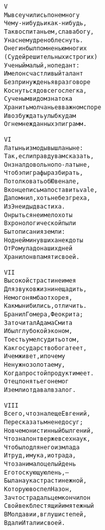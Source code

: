\begin{minipage}[t]{\dimexpr 0.5\textwidth -\tabcolsep-.5pt}
\begin{alltt}\normalfont\centering
V
Мы все учились понемногу
Чему-нибудь и как-нибудь,
Так воспитаньем, слава богу,
У нас немудрено блеснуть.
Онегин был по мненью многих
(Судей решительных и строгих)
Ученый малый, но педант:
Имел он счастливый талант
Без принужденья в разговоре
Коснуться до всего слегка,
С ученым видом знатока
Хранить молчанье в важном споре
И возбуждать улыбку дам
Огнем нежданных эпиграмм.
\end{alltt}
\end{minipage}

\begin{minipage}[t]{\dimexpr 0.5\textwidth -\tabcolsep-.5pt}
\begin{alltt}\normalfont\centering
VI
Латынь из моды вышла ныне:
Так, если правду вам сказать,
Он знал довольно по-латыне,
Чтоб эпиграфы разбирать,
Потолковать об Ювенале,
В конце письма поставить vale,
Да помнил, хоть не без греха,
Из Энеиды два стиха.
Он рыться не имел охоты
В хронологической пыли
Бытописания земли:
Но дней минувших анекдоты
От Ромула до наших дней
Хранил он в памяти своей.
\end{alltt}
\end{minipage}
\clearpage

\begin{minipage}[t]{\dimexpr 0.5\textwidth -\tabcolsep-.5pt}
\begin{alltt}\normalfont\centering
VII
Высокой страсти не имея
Для звуков жизни не щадить,
Не мог он ямба от хорея,
Как мы ни бились, отличить.
Бранил Гомера, Феокрита;
Зато читал Адама Смита
И был глубокой эконом,
То есть умел судить о том,
Как государство богатеет,
И чем живет, и почему
Не нужно золота ему,
Когда простой продукт имеет.
Отец понять его не мог
И земли отдавал в залог.
\end{alltt}
\end{minipage}

\begin{minipage}[t]{\dimexpr 0.5\textwidth -\tabcolsep-.5pt}
\begin{alltt}\normalfont\centering
VIII
Всего, что знал еще Евгений,
Пересказать мне недосуг;
Но в чем он истинный был гений,
Что знал он тверже всех наук,
Что было для него измлада
И труд, и мука, и отрада,
Что занимало целый день
Его тоскующую лень, —
Была наука страсти нежной,
Которую воспел Назон,
За что страдальцем кончил он
Свой век блестящий и мятежный
В Молдавии, в глуши степей,
Вдали Италии своей.
\end{alltt}
\end{minipage}
\clearpage

